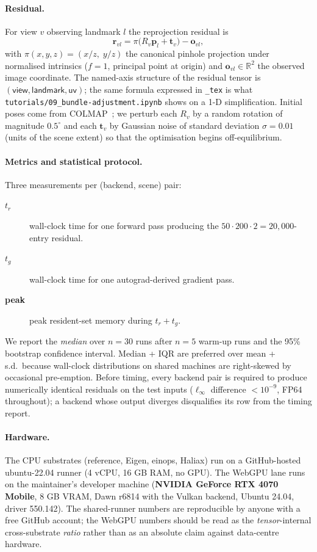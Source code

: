 \documentclass[10pt,twocolumn]{article}
\newcommand{\ax}[1]{\textsf{#1}}                              %
\newcommand{\udltex}{\code{\_tex}}                            %
\newcommand{\code}[1]{\texttt{#1}}
\begin{document}
\paragraph{Residual.}
For view $v$ observing landmark $l$ the reprojection residual is
\begin{equation*}
\mathbf{r}_{vl} = \pi\bigl(R_v \mathbf{p}_l + \mathbf{t}_v\bigr) - \mathbf{o}_{vl},
\end{equation*}
with $\pi(x, y, z) = (x/z,\; y/z)$ the canonical pinhole projection
under normalised intrinsics ($f = 1$, principal point at origin) and
$\mathbf{o}_{vl} \in \mathbb{R}^{2}$ the observed image coordinate.
The named-axis structure of the residual tensor is
$(\ax{view}, \ax{landmark}, \ax{uv})$; the same formula expressed
in \udltex{} is what \code{tutorials/09\_bundle-adjustment.ipynb}
shows on a 1-D simplification. Initial poses come from
COLMAP~\cite{schoenberger2016sfm}; we perturb each $R_v$ by a random
rotation of magnitude $0.5^\circ$ and each $\mathbf{t}_v$ by Gaussian
noise of standard deviation $\sigma = 0.01$ (units of the scene
extent) so that the optimisation begins off-equilibrium.

\paragraph{Metrics and statistical protocol.}
Three measurements per (backend, scene) pair:

\begin{description}
  \item[$t_r$] wall-clock time for one forward pass producing the
        $50 \cdot 200 \cdot 2 = 20{,}000$-entry residual.
  \item[$t_g$] wall-clock time for one autograd-derived gradient pass.
  \item[\textbf{peak}] peak resident-set memory during $t_r + t_g$.
\end{description}

We report the \emph{median} over $n{=}30$ runs after $n{=}5$ warm-up
runs and the 95\% bootstrap confidence interval. Median + IQR are
preferred over mean + s.d.\ because wall-clock distributions on
shared machines are right-skewed by occasional pre-emption. Before
timing, every backend pair is required to produce numerically
identical residuals on the test inputs ($\ell_\infty$ difference
$< 10^{-9}$, FP64 throughout); a backend whose output diverges
disqualifies its row from the timing report.

\paragraph{Hardware.}
The CPU substrates (reference, Eigen, einops, Haliax) run on a
GitHub-hosted ubuntu-22.04 runner (4 vCPU, 16 GB RAM, no GPU). The
WebGPU lane runs on the maintainer's developer machine
(\textbf{NVIDIA GeForce RTX 4070 Mobile}, 8 GB VRAM, Dawn r6814 with
the Vulkan backend, Ubuntu 24.04, driver 550.142). The
shared-runner numbers are reproducible by anyone with a free GitHub
account; the WebGPU numbers should be read as the
\emph{tensor}-internal cross-substrate \emph{ratio} rather than as
an absolute claim against data-centre hardware.
\end{document}
